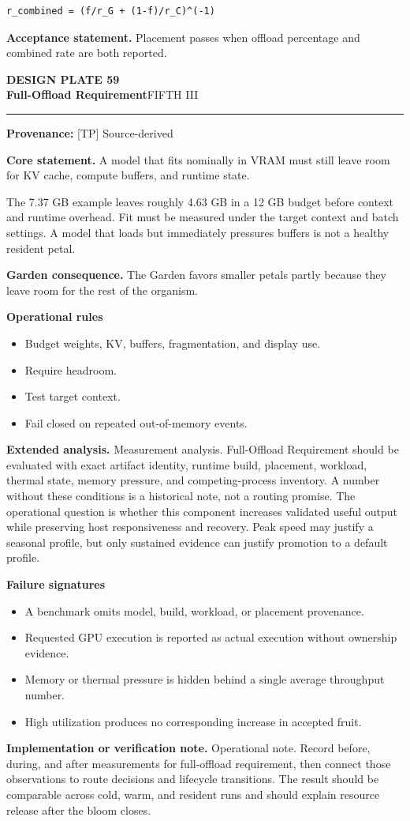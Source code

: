 \documentclass[10pt,letterpaper,oneside]{article}
\newcommand{\prov}[1]{\textcolor{gardenBlue}{\sffamily\footnotesize\textbf{Provenance:} #1}}
\newcommand{\platetitle}[3]{%
  \begin{minipage}[t][0.54in][t]{\textwidth}
  {\sffamily\bfseries\color{gardenDeep}\fontsize{9}{10}\selectfont DESIGN PLATE #1}\\[-1pt]
  {\sffamily\bfseries\color{gardenInk}\fontsize{16.5}{18}\selectfont #2}\hfill{\sffamily\color{gardenGreen}\large #3}
  \end{minipage}\vspace{-2pt}\hrule\vspace{5pt}}
\begin{document}
\begin{lstlisting}
r_combined = (f/r_G + (1-f)/r_C)^(-1)
\end{lstlisting}
\begin{acceptbox}
\textbf{Acceptance statement.} Placement passes when offload percentage and combined rate are both reported.
\end{acceptbox}
\newpage
\platetitle{59}{Full-Offload Requirement}{FIFTH III}
\prov{[TP] Source-derived}
\fontsize{8.85}{10.45}\selectfont
\begin{corebox}
\textbf{Core statement.} A model that fits nominally in VRAM must still leave room for KV cache, compute buffers, and runtime state.
\end{corebox}
The 7.37 GB example leaves roughly 4.63 GB in a 12 GB budget before context and runtime overhead. Fit must be measured under the target context and batch settings. A model that loads but immediately pressures buffers is not a healthy resident petal.

\textbf{Garden consequence.} The Garden favors smaller petals partly because they leave room for the rest of the organism.

\textbf{Operational rules}
\begin{itemize}
\item Budget weights, KV, buffers, fragmentation, and display use.
\item Require headroom.
\item Test target context.
\item Fail closed on repeated out-of-memory events.
\end{itemize}
\textbf{Extended analysis.} Measurement analysis. Full-Offload Requirement should be evaluated with exact artifact identity, runtime build, placement, workload, thermal state, memory pressure, and competing-process inventory. A number without these conditions is a historical note, not a routing promise. The operational question is whether this component increases validated useful output while preserving host responsiveness and recovery. Peak speed may justify a seasonal profile, but only sustained evidence can justify promotion to a default profile.

\textbf{Failure signatures}
\begin{itemize}
\item A benchmark omits model, build, workload, or placement provenance.
\item Requested GPU execution is reported as actual execution without ownership evidence.
\item Memory or thermal pressure is hidden behind a single average throughput number.
\item High utilization produces no corresponding increase in accepted fruit.
\end{itemize}
\textbf{Implementation or verification note.} Operational note. Record before, during, and after measurements for full-offload requirement, then connect those observations to route decisions and lifecycle transitions. The result should be comparable across cold, warm, and resident runs and should explain resource release after the bloom closes.
\end{document}
